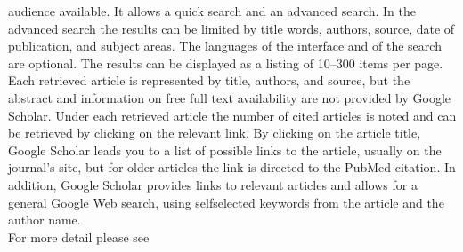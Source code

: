 \begin{enumerate}
	audience available. It allows a quick search and an advanced search. In the advanced search the results can be limited by title words, authors, source, date of publication, and subject areas. The languages of the interface and of the search are optional. The results can be displayed as a listing of 10–300 items per page. Each retrieved article is represented by title, authors, and
	source, but the abstract and information on free full text availability are not provided by Google Scholar. Under each retrieved article the number of cited
	articles is noted and can be retrieved by clicking on the relevant link. By clicking on the article title, Google Scholar leads you to a list of possible links to the article, usually on the journal’s site, but for older articles the
	link is directed to the PubMed citation. In addition, Google Scholar provides links to relevant articles and 	allows for a general Google Web search, using selfselected keywords from the article and the author name.\\
	For more detail please see \cite{Matthew2008}
\end{enumerate}

